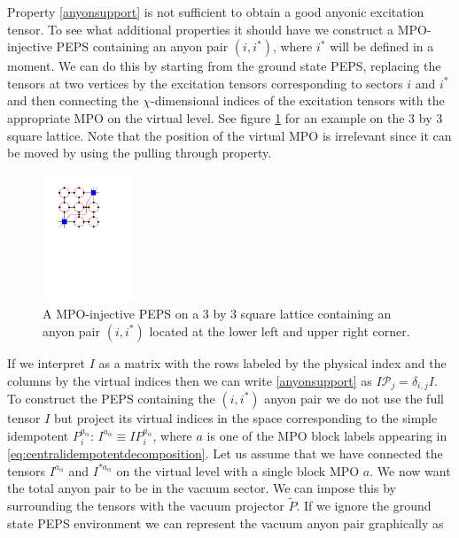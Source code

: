 \documentclass[12 pt]{article}
\begin{document}
Property \eqref{anyonsupport} is not sufficient to obtain a good anyonic excitation tensor. To see what additional properties it should have we construct a MPO-injective PEPS containing an anyon pair $(i,i^*)$, where $i^*$ will be defined in a moment. We can do this by  starting from the ground state PEPS, replacing the tensors at two vertices by the excitation tensors corresponding to sectors $i$ and $i^*$ and then connecting the $\chi$-dimensional indices of the excitation tensors with the appropriate MPO on the virtual level. See figure \ref{fig:anyonpair} for an example on the 3 by 3 square lattice. Note that the position of the virtual MPO is irrelevant since it can be moved by using the pulling through property.

\begin{figure}
  \centering
    \includegraphics[width=0.24\textwidth]{anyonpair}
\caption{A MPO-injective PEPS on a 3 by 3 square lattice containing an anyon pair $(i,i^*)$ located at the lower left and upper right corner.}
\label{fig:anyonpair}
\end{figure}

If we interpret $I$ as a matrix with the rows labeled by the physical index and the columns by the virtual indices then we can write \eqref{anyonsupport} as $I \mathcal{P}_j= \delta_{i,j}I$. To construct the PEPS containing the $(i,i^*)$ anyon pair we do not use the full tensor $I$ but project its virtual indices in the space corresponding to the simple idempotent $P_i^{a_\alpha}$: $I^{a_\alpha} \equiv IP_i^{a_\alpha}$, where $a$ is one of the MPO block labels appearing in \eqref{eq:centralidempotentdecomposition}. Let us assume that we have connected the tensors $I^{a_\alpha}$ and $I^{*a_\alpha}$ on the virtual level with a single block MPO $a$. We now want the total anyon pair to be in the vacuum sector. We can impose this by surrounding the tensors with the vacuum projector $\tilde{P}$. If we ignore the ground state PEPS environment we can represent the vacuum anyon pair graphically as
\end{document}
